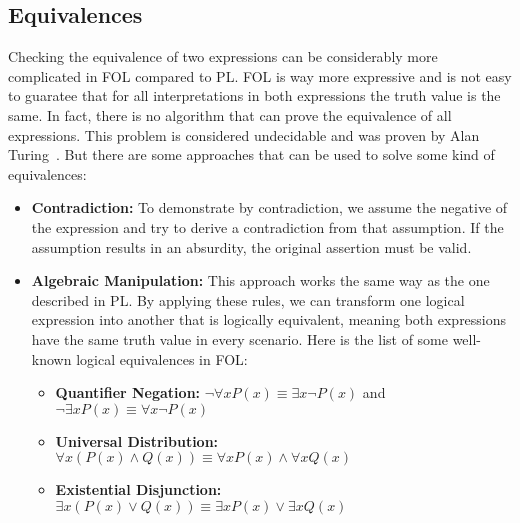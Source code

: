 \subsection{Equivalences}
Checking the equivalence of two expressions can be considerably more complicated in \gls{FOL} compared to \gls{PL}. \gls{FOL} is way more expressive and is not easy to guaratee that for all interpretations in both expressions the truth value is the same. In fact, there is no algorithm that can prove the equivalence of all expressions. This problem is considered undecidable and was proven by Alan Turing~\cite{turing1936}. But there are some approaches that can be used to solve some kind of equivalences:

\begin{itemize}
    \item \textbf{Contradiction:} To demonstrate by contradiction, we assume the negative of the expression and try to derive a contradiction from that assumption. If the assumption results in an absurdity, the original assertion must be valid.
    \item \textbf{Algebraic Manipulation:} This approach works the same way as the one described in \gls{PL}. By applying these rules, we can transform one logical expression into another that is logically equivalent, meaning both expressions have the same truth value in every scenario. Here is the list of some well-known logical equivalences in \gls{FOL}:

    \begin{itemize}
        \item \textbf{Quantifier Negation:} \( \neg \forall x P(x) \equiv \exists x \neg P(x) \) and \( \neg \exists x P(x) \equiv \forall x \neg P(x) \)
        \item \textbf{Universal Distribution:} \( \forall x (P(x) \land Q(x)) \equiv \forall x P(x) \land \forall x Q(x) \)
        \item \textbf{Existential Disjunction:} \( \exists x (P(x) \lor Q(x)) \equiv \exists x P(x) \lor \exists x Q(x) \)

    \end{itemize}

\end{itemize}  


